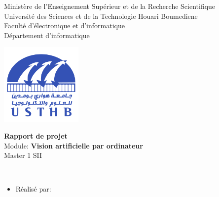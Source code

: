 \documentclass[12pt]{report}
\begin{document}
\begin{center}
\normalsize{Ministère de l'Enseignement Supérieur et de la Recherche Scientifique}\\
\normalsize{Université des Sciences et de la Technologie Houari Boumediene}\\
\normalsize{Faculté d'électronique et d'informatique}\\
\normalsize{Département d'informatique}\\
\end{center}
\begin{center}
\includegraphics[width=4cm,height=4cm]{usthb.png}
\end{center}

\begin{center}
\Huge{\textbf{Rapport de projet}}\\
\vspace{0.7cm}
\large{Module: \textbf{Vision artificielle par ordinateur}}\\
\vspace{0.2cm}
\large{Master 1 SII}\\
\vspace{1.5cm}
\end{center}
\vspace{3cm}
\\
\begin{itemize}
    \item{Réalisé par:}
\end{itemize}

\vspace{3cm}
\end{document}
